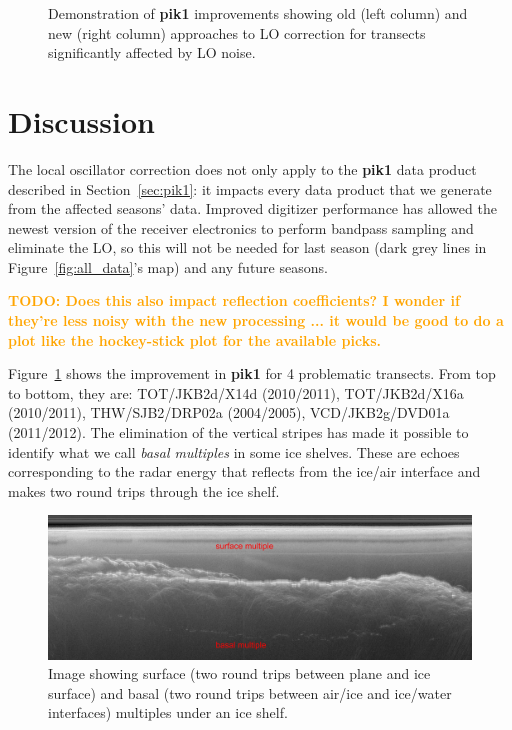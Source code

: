 \documentclass[11pt]{article}
\newcommand{\future}[1]{\ifthenelse{\boolean{include-future}} {\textcolor{Orange}{\textbf{TODO: #1}}}{}}
\newcommand{\secref}[1]{Section~\ref{#1}}
\newcommand{\figref}[1]{Figure~\ref{#1}}
\begin{document}
\begin{figure}[]
\caption[]{Demonstration of \textbf{pik1} improvements showing old (left column) and new (right column) approaches to LO correction for transects significantly affected by LO noise.}
\label{fig:LO_results}
\end{figure}

\section{Discussion}


The local oscillator correction does not only apply to the \textbf{pik1} data product described in \secref{sec:pik1}: it impacts every data product that we generate from the affected seasons' data. Improved digitizer performance has allowed the newest version of the receiver electronics to perform bandpass sampling and eliminate the LO, so this will not be needed for last season (dark grey lines in \figref{fig:all_data}'s map) and any future seasons.

\future{Does this also impact reflection coefficients? I wonder if they're less noisy with the new processing ... it would be good to do a plot like the hockey-stick plot for the available picks.}

\figref{fig:LO_results} shows the improvement in \textbf{pik1} for 4 problematic transects. From top to bottom, they are: TOT/JKB2d/X14d (2010/2011), TOT/JKB2d/X16a (2010/2011), THW/SJB2/DRP02a (2004/2005), VCD/JKB2g/DVD01a (2011/2012). 
The elimination of the vertical stripes has made it possible to identify what we call \emph{basal multiples} in some ice shelves. These are echoes corresponding to the radar energy that reflects from the ice/air interface and makes two round trips through the ice shelf. 

\begin{figure}[ht!]
\centering
\includegraphics[width=1.0\columnwidth]{figures/TOT_multiples_small.jpg}
\caption[]{Image showing surface (two round trips between plane and ice surface) and basal (two round trips between air/ice and ice/water interfaces) multiples under an ice shelf.}
\label{fig:multiples}
\end{figure}
\end{document}
